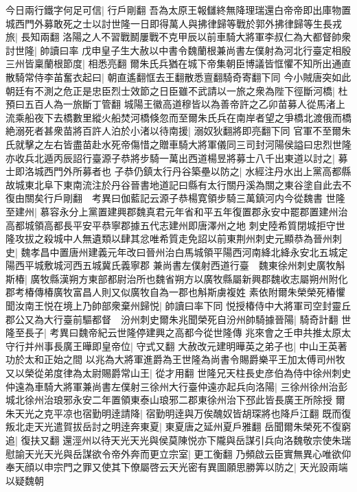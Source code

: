 今日兩行鐵字何足可信|{
	行戶剛翻}
吾為太原王報讎終無降理瑞還白帝帝即出庫物置城西門外募敢死之士以討世隆一日即得萬人與拂律歸等戰於郭外拂律歸等生長戎旅|{
	長知兩翻}
洛陽之人不習戰鬭屢戰不克甲辰以前車騎大將軍李叔仁為大都督帥衆討世隆|{
	帥讀曰率}
戊申皇子生大赦以中書令魏蘭根兼尚書左僕射為河北行臺定相殷三州皆稟蘭根節度|{
	相悉亮翻}
爾朱氏兵猶在城下帝集朝臣博議皆恇懼不知所出通直散騎常侍李苖奮衣起曰|{
	朝直遙翻恇去王翻散悉亶翻騎奇寄翻下同}
今小賊唐突如此朝廷有不測之危正是忠臣烈士效節之日臣雖不武請以一旅之衆為陛下徑斷河橋|{
	杜預曰五百人為一旅斷丁管翻}
城陽王徽高道穆皆以為善帝許之乙卯苗募人從馬渚上流乘船夜下去橋數里縱火船焚河橋倏忽而至爾朱氏兵在南岸者望之爭橋北渡俄而橋絶溺死者甚衆苗將百許人泊於小渚以待南援|{
	溺奴狄翻將即亮翻下同}
官軍不至爾朱氏就擊之左右皆盡苗赴水死帝傷惜之贈車騎大將軍儀同三司封河陽侯謚曰忠烈世隆亦收兵北遁丙辰詔行臺源子恭將步騎一萬出西道楊昱將募士八千出東道以討之|{
	募士即洛城西門外所募者也}
子恭仍鎮太行丹谷築壘以防之|{
	水經注丹水出上黨高都縣故城東北阜下東南流注於丹谷晉書地道記曰縣有太行關丹溪為關之東谷塗自此去不復由關矣行戶剛翻　考異曰伽藍記云源子恭楊寛領步騎三萬鎮河内今從魏書}
世隆至建州|{
	慕容永分上黨置建興郡魏真君元年省和平五年復置郡永安中罷郡置建州治高都城領高都長平安平恭寧郡據五代志建州即唐澤州之地}
刺史陸希質閉城拒守世隆攻拔之殺城中人無遺類以肆其忿唯希質走免詔以前東荆州刺史元顯恭為晉州刺史|{
	魏孝昌中置唐州建義元年改曰晉州治白馬城領平陽西河南絳北絳永安北五城定陽西平城敷城河西五城冀氏義寧郡}
兼尚書左僕射西道行臺　魏東徐州刺史廣牧斛斯椿|{
	廣牧縣漢朔方東部都尉治所也魏省朔方以廣牧縣屬新興郡魏收志屬朔州附化郡考椿傳椿廣牧富昌人則又似廣牧自為一郡也斛斯虜複姓}
素依附爾朱榮榮死椿懼聞汝南王悦在境上乃帥部衆棄州歸悦|{
	帥讀曰率下同}
悦授椿侍中大將軍司空封靈丘郡公又為大行臺前驅都督　汾州刺史爾朱兆聞榮死自汾州帥騎據晉陽|{
	騎奇計翻}
世隆至長子|{
	考異曰魏帝紀云世隆停建興之高都今從世隆傳}
兆來會之壬申共推太原太守行并州事長廣王曄即皇帝位|{
	守式又翻}
大赦改元建明曄英之弟子也|{
	中山王英著功於太和正始之間}
以兆為大將軍進爵為王世隆為尚書令賜爵樂平王加太傅司州牧又以榮從弟度律為太尉賜爵常山王|{
	從才用翻}
世隆兄天柱長史彦伯為侍中徐州刺史仲遠為車騎大將軍兼尚書左僕射三徐州大行臺仲遠亦起兵向洛陽|{
	三徐州徐州治彭城北徐州治琅邪永安二年置領東泰山琅邪二郡東徐州治下邳此皆長廣王所除授}
爾朱天光之克平凉也宿勤明逹請降|{
	宿勤明逹與万俟醜奴皆胡琛將也降戶江翻}
既而復叛北走天光遣賀拔岳討之明逹奔東夏|{
	東夏唐之延州夏戶雅翻}
岳聞爾朱榮死不復窮追|{
	復扶又翻}
還涇州以待天光天光與侯莫陳悦亦下隴與岳謀引兵向洛魏敬宗使朱瑞慰諭天光天光與岳謀欲令帝外奔而更立宗室|{
	更工衡翻}
乃頻啟云臣實無異心唯欲仰奉天顔以申宗門之罪又使其下僚屬啓云天光密有異圖願思勝筭以防之|{
	天光設兩端以疑魏朝}
